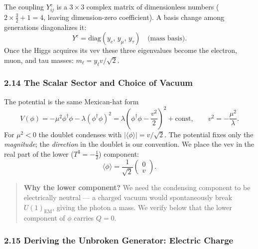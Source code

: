 \documentclass[12pt,a4paper]{article}
\begin{document}
The coupling $Y^e_{ij}$ is a $3\times 3$ complex matrix of dimensionless numbers ($2\times\tfrac{3}{2} + 1 = 4$, leaving dimension-zero coefficient). A basis change among generations diagonalizes it:
\begin{equation}
  Y^e = \mathrm{diag}(y_e,\, y_\mu,\, y_\tau) \quad\text{(mass basis)} .
  \label{eq:sg:mass_basis}
\end{equation}
Once the Higgs acquires its vev these three eigenvalues become the electron, muon, and tau masses: $m_\ell = y_\ell v/\sqrt{2}$.

\subsubsection*{2.14 \quad The Scalar Sector and Choice of Vacuum}

The potential is the same Mexican-hat form
\begin{equation}
  V(\phi) = -\mu^2\phi^\dagger\phi - \lambda(\phi^\dagger\phi)^2
           = \lambda\!\left(\phi^\dagger\phi - \frac{v^2}{2}\right)^{\!2} + \text{const},
  \qquad v^2 = -\frac{\mu^2}{\lambda} .
\end{equation}
For $\mu^2 < 0$ the doublet condenses with $|\langle\phi\rangle| = v/\sqrt{2}$. The potential fixes only the \emph{magnitude}; the \emph{direction} in the doublet is our convention. We place the vev in the real part of the lower ($T^3 = -\tfrac{1}{2}$) component:
\begin{equation}
  \boxed{\;
  \langle\phi\rangle = \frac{1}{\sqrt{2}}\begin{pmatrix}0\\v\end{pmatrix} .
  \;}
  \label{eq:sg:lsm_vev}
\end{equation}

\begin{quote}
  \textbf{Why the lower component?} We need the condensing component to be electrically neutral — a charged vacuum would spontaneously break $U(1)_{\mathrm{EM}}$, giving the photon a mass. We verify below that the lower component of $\phi$ carries $Q = 0$.
\end{quote}

\subsubsection*{2.15 \quad Deriving the Unbroken Generator: Electric Charge}
\end{document}
